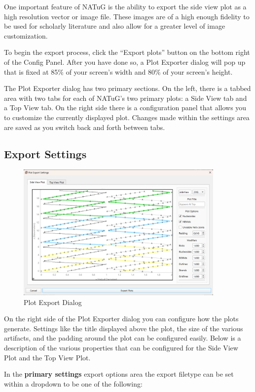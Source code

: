\documentclass[titlepage]{article}
\begin{document}
One important feature of NATuG is the ability to export the side view plot as a high resolution vector or image file. These images are of a high enough fidelity to be used for scholarly literature and also allow for a greater level of image customization.

To begin the export process, click the ``Export plots'' button on the bottom right of the Config Panel. After you have done so, a Plot Exporter dialog will pop up that is fixed at 85\% of your screen's width and 80\% of your screen's height.

The Plot Exporter dialog has two primary sections. On the left, there is a tabbed area with two tabs for each of NATuG's two primary plots: a Side View tab and a Top View tab. On the right side there is a configuration panel that allows you to customize the currently displayed plot. Changes made within the settings area are saved as you switch back and forth between tabs.

\subsection{Export Settings}

\begin{figure}[H] \label{fig:plot-export-dialog}
	\centering
	\caption{Plot Export Dialog}
	\includegraphics[width=4in]{plot-export-dialog.png}
\end{figure}

On the right side of the Plot Exporter dialog you can configure how the plots generate. Settings like the title displayed above the plot, the size of the various artifacts, and the padding around the plot can be configured easily. Below is a description of the various properties that can be configured for the Side View Plot and the Top View Plot.

In the \textbf{primary settings} export options area the export filetype can be set within a dropdown to be one of the following:
\end{document}
